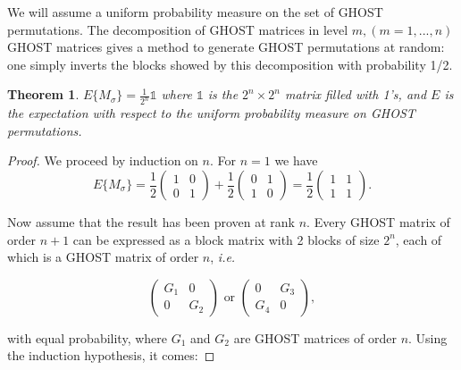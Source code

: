 \documentclass[12pt]{article}
\newtheorem{basictheorem}{Theorem}
\begin{document}
  We will assume a uniform probability measure on the set of GHOST
  permutations. The decomposition of GHOST matrices in level
  $m, (m = 1, ..., n)$ GHOST matrices gives a method to generate
  GHOST permutations at random: one simply inverts the blocks showed
  by this decomposition with probability 1/2.

  \begin{basictheorem}\label{uniformity}
    $E\{ M_\sigma \} = \frac{1}{2^n} \mathbb{1}$ 
    where $\mathbb{1}$ is the $2^n \times 2^n$
    matrix filled with 1's, and $E$ is the expectation with respect to
    the uniform probability measure on GHOST permutations.
  \end{basictheorem}

  \begin{proof}
    We proceed by induction on $n$. For $n=1$ we have
    \begin{equation*}
      E\{ M_\sigma \} =
      \frac{1}{2} \left( \begin{array}{cc}
        1 & 0 \\
        0 & 1
      \end{array} \right) +
      \frac{1}{2} \left( \begin{array}{cc}
        0 & 1 \\
        1 & 0
      \end{array} \right) =
      \frac{1}{2} \left( \begin{array}{cc}
        1 & 1 \\
        1 & 1
      \end{array} \right).
    \end{equation*}

    Now assume that the result has been proven at rank $n$.
    Every GHOST matrix of order $n+1$ can be expressed as 
    a block matrix with 2 blocks of size $2^n$, each of which is
    a GHOST matrix of order $n$, \textit{i.e.}

    \begin{equation*}
      \left( \begin{array}{cc}
        G_1 & 0 \\
        0   & G_2
      \end{array} \right) \text{ or }
      \left( \begin{array}{cc}
        0 & G_3 \\
        G_4 & 0
      \end{array} \right),
    \end{equation*}

    \noindent
    with equal probability, where $G_1$ and $G_2$ are GHOST matrices
    of order $n$. Using the induction hypothesis, it comes: 


\end{proof}
\end{document}
